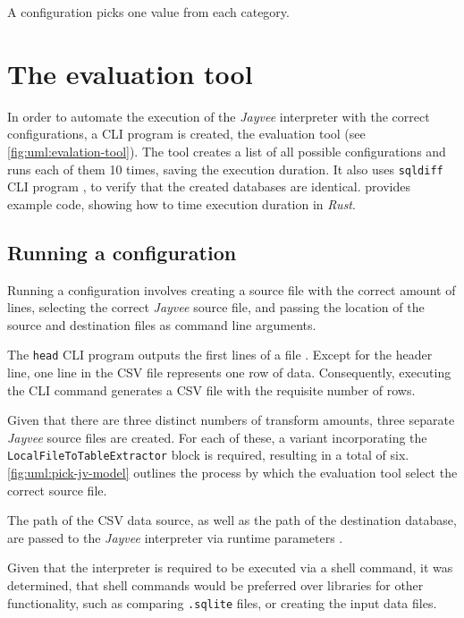 A configuration picks one value from each category.


\section{The evaluation tool}
In order to automate the execution of the \emph{Jayvee} interpreter with the correct configurations, a \ac{CLI} program is created, the evaluation tool (see \autoref{fig:uml:evalation-tool}).
The tool creates a list of all possible configurations and runs each of them 10 times, saving the execution duration.
It also uses \Verb|sqldiff| \ac{CLI} program \autocite{sqldiff}, to verify that the created databases are identical.
\textcite{so:benchmark} provides example code, showing how to time execution duration in \emph{Rust}.

\subsection{Running a configuration}

Running a configuration involves creating a source file with the correct amount of lines,
selecting the correct \emph{Jayvee} source file, and passing the location of the source and destination files as command line arguments.

The \Verb|head| \ac{CLI} program outputs the first lines of a file \autocite{head}.
Except for the header line, one line in the \ac{CSV} file represents one row of data.
Consequently, executing the \ac{CLI} command
generates a \ac{CSV} file with the requisite number of rows.

Given that there are three distinct numbers of transform amounts, three separate \emph{Jayvee} source files are created.
For each of these, a variant incorporating the \Verb|LocalFileToTableExtractor| block is required, resulting in a total of six.
\autoref{fig:uml:pick-jv-model} outlines the process by which the evaluation tool select the correct source file.

The path of the \ac{CSV} data source, as well as the path of the destination database, are passed to the \emph{Jayvee} interpreter via runtime parameters \autocite{jvalue:jayvee:docs:runtime}.

Given that the interpreter is required to be executed via a shell command, it was determined, that shell commands would be preferred over libraries for other functionality, such as comparing \Verb|.sqlite| files, or creating the input data files.

